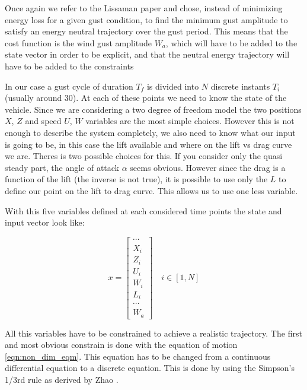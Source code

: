 \par Once again we refer to the Lissaman paper \cite{Lissaman2007neutral} and chose, instead of minimizing energy loss for a given gust condition, to find the minimum gust amplitude to satisfy an energy neutral trajectory over the gust period.
This means that the cost function is the wind gust amplitude $W_a$, which will have to be added to the state vector in order to be explicit, and that the neutral energy trajectory will have to be added to the constraints


\par In our case a gust cycle of duration $T_f$ is divided into $N$ discrete instants $T_i$ (usually around 30).
At each of these points we need to know the state of the vehicle.
Since we are considering a two degree of freedom model the two positions $X$, $Z$ and speed $U$, $W$ variables are the most simple choices.
However this is not enough to describe the system completely, we also need to know what our input is going to be, in this case the lift available and where on the lift vs drag curve we are.
Theres is two possible choices for this.
If you consider only the quasi steady part, the angle of attack $\alpha$ seems obvious.
However since the drag is a function of the lift (the inverse is not true), it is possible to use only the $L$ to define our point on the lift to drag curve.
This allows us to use one less variable.

\par With this five variables defined at each considered time points the state and input vector look like:

\begin{equation}
	x= 
	\begin{bmatrix}
		\cdots \\
		X_i \\
		Z_i \\
		U_i \\
		W_i \\
		L_i \\
		\cdots \\
		W_a
	\end{bmatrix}
	\quad i \in [1,N]
	\label{eqn:big_vector}
\end{equation}

\par All this variables have to be constrained to achieve a realistic trajectory.
The first and most obvious constrain is done with the equation of motion \ref{eqn:non_dim_eqm}.
This equation has to be changed from a continuous differential equation to a discrete equation.
This is done by using the Simpson's 1/3rd rule as derived by Zhao \cite{zhao2004optimal}.


